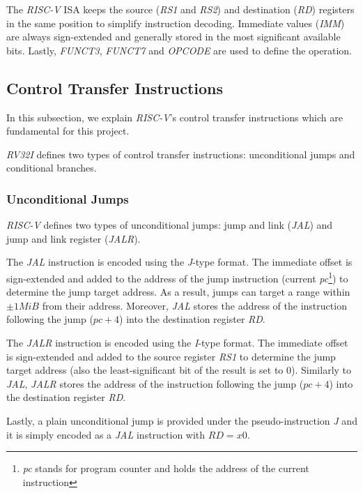 The \textit{RISC-V} ISA keeps the source (\textit{RS1} and \textit{RS2}) and destination
(\textit{RD}) registers in the same position to simplify instruction decoding. Immediate
values (\textit{IMM}) are always sign-extended and generally stored in the most
significant available bits. Lastly, \textit{FUNCT3}, \textit{FUNCT7} and \textit{OPCODE}
are used to define the operation.

\subsection{Control Transfer Instructions}
\label{subsec:riscv_controltransfer}

In this subsection, we explain \textit{RISC-V}'s control transfer instructions which
are fundamental for this project.

\textit{RV32I} defines two types of control transfer instructions: unconditional
jumps and conditional branches.

\subsubsection{Unconditional Jumps}
\label{subsubsec:riscv_unconditionalj}

\textit{RISC-V} defines two types of unconditional jumps: jump and link (\textit{JAL})
and jump and link register (\textit{JALR}).

The \textit{JAL} instruction is encoded using the \textit{J}-type format. The immediate
offset is sign-extended and added to the address of the jump instruction (current
\textit{pc}\footnote{\textit{pc} stands for program counter and holds the address
of the current instruction}) to determine the jump target address. As a result, jumps
can target a range within $\pm 1 MiB$ from their address. Moreover, \textit{JAL}
stores the address of the instruction following the jump ($\textit{pc}+ 4$) into
the destination register \textit{RD}.

The \textit{JALR} instruction is encoded using the \textit{I}-type format. The
immediate offset is sign-extended and added to the source register \textit{RS1} to
determine the jump target address (also the least-significant bit of the result
is set to $0$). Similarly to \textit{JAL}, \textit{JALR} stores the address of the
instruction following the jump ($\textit{pc}+ 4$) into the destination register \textit{RD}.

Lastly, a plain unconditional jump is provided under the pseudo-instruction \textit{J}
and it is simply encoded as a \textit{JAL} instruction with $\textit{RD}= x0$.

